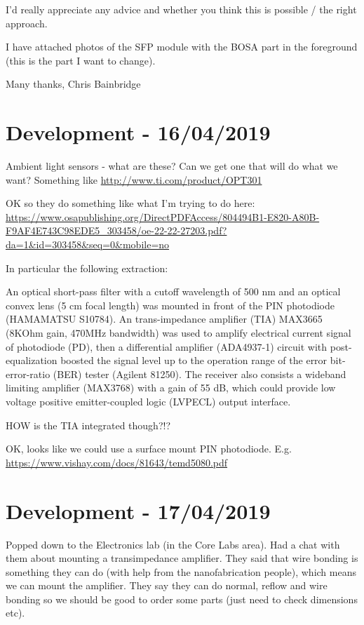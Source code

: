 I'd really appreciate any advice and whether you think this is possible / the right approach.

I have attached photos of the SFP module with the BOSA part in the foreground (this is the part I want to change).

Many thanks,
Chris Bainbridge

\section{Development - 16/04/2019}
Ambient light sensors - what are these? Can we get one that will do what we
want? Something like \url{http://www.ti.com/product/OPT301}

OK so they do something like what I'm trying to do here:
\url{https://www.osapublishing.org/DirectPDFAccess/804494B1-E820-A80B-F9AF4E743C98EDE5_303458/oe-22-22-27203.pdf?da=1&id=303458&seq=0&mobile=no}

In particular the following extraction:

An optical short-pass filter with a cutoff wavelength of 500 nm and an optical
convex lens (5 cm focal length) was mounted in front of the PIN photodiode
(HAMAMATSU  S10784). An trans-impedance amplifier (TIA) MAX3665 (8KOhm
gain, 470MHz bandwidth) was used to amplify electrical current signal
of photodiode (PD), then a differential amplifier (ADA4937-1) circuit
with post-equalization boosted the signal level up to the operation range of
the error bit-error-ratio (BER) tester (Agilent  81250). The receiver also
consists a wideband limiting amplifier (MAX3768) with a gain of 55 dB,
which could provide low voltage positive emitter-coupled logic (LVPECL) output
interface.

HOW is the TIA integrated though?!?

OK, looks like we could use a surface mount PIN photodiode. E.g.
\url{https://www.vishay.com/docs/81643/temd5080.pdf}

\section{Development - 17/04/2019}
Popped down to the Electronics lab (in the Core Labs area). Had a chat with
them about mounting a transimpedance amplifier. They said that wire bonding
is something they can do (with help from the nanofabrication people), which
means we can mount the amplifier.
They say they can do normal, reflow and wire bonding so we should be good to
order some parts (just need to check dimensions etc).

